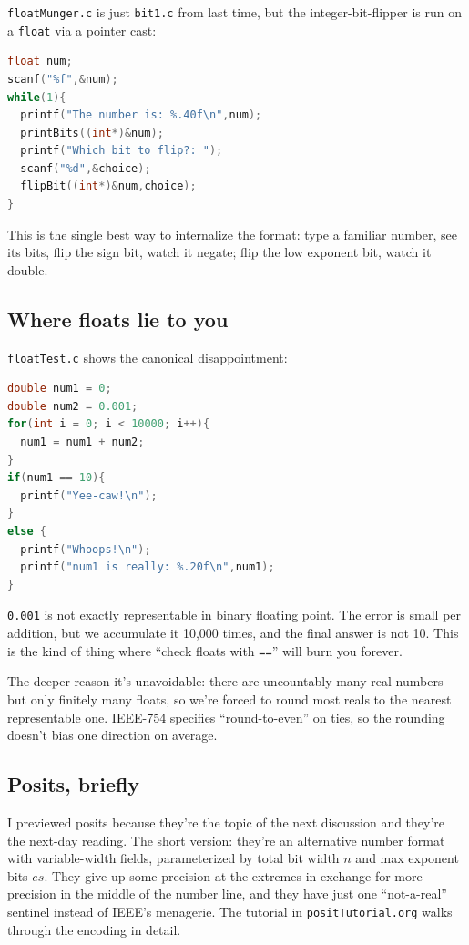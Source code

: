 \documentclass[11pt]{article}
\begin{document}
\texttt{floatMunger.c} is just \texttt{bit1.c} from last time, but
the integer-bit-flipper is run on a \texttt{float} via a pointer
cast:

\begin{lstlisting}[language=C]
float num;
scanf("%f",&num);
while(1){
  printf("The number is: %.40f\n",num);
  printBits((int*)&num);
  printf("Which bit to flip?: ");
  scanf("%d",&choice);
  flipBit((int*)&num,choice);
}
\end{lstlisting}

This is the single best way to internalize the format: type a
familiar number, see its bits, flip the sign bit, watch it negate;
flip the low exponent bit, watch it double.

\subsection*{Where floats lie to you}

\texttt{floatTest.c} shows the canonical disappointment:

\begin{lstlisting}[language=C]
double num1 = 0;
double num2 = 0.001;
for(int i = 0; i < 10000; i++){
  num1 = num1 + num2;
}
if(num1 == 10){
  printf("Yee-caw!\n");
}
else {
  printf("Whoops!\n");
  printf("num1 is really: %.20f\n",num1);
}
\end{lstlisting}

\texttt{0.001} is not exactly representable in binary floating point.
The error is small per addition, but we accumulate it 10{,}000 times,
and the final answer is not 10. This is the kind of thing where
``check floats with \texttt{==}'' will burn you forever.

The deeper reason it's unavoidable: there are uncountably many real
numbers but only finitely many floats, so we're forced to round most
reals to the nearest representable one. IEEE-754 specifies
``round-to-even'' on ties, so the rounding doesn't bias one direction
on average.

\subsection*{Posits, briefly}

I previewed posits because they're the topic of the next discussion
and they're the next-day reading. The short version: they're an
alternative number format with variable-width fields, parameterized
by total bit width $n$ and max exponent bits $es$. They give up some
precision at the extremes in exchange for more precision in the
middle of the number line, and they have just one ``not-a-real''
sentinel instead of IEEE's menagerie. The tutorial in
\texttt{positTutorial.org} walks through the encoding in detail.
\end{document}
